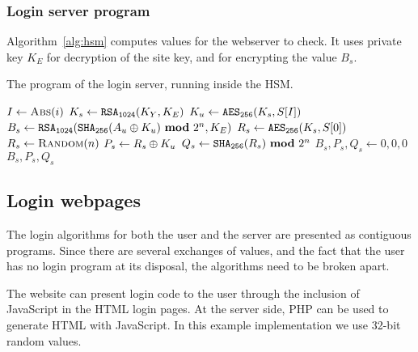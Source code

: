 \subsubsection{Login server program}
Algorithm~\vref{alg:hsm} computes values for the webserver to check.
It uses private key $K_E$ for decryption of the site key,
and for encrypting the value $B_s$.
\nopagebreak
\begin{algorithm}[H]
\caption{The program of the login server, running inside the HSM.}
\label{alg:hsm}
\begin{algorithmic}[1]
\State $I\gets\Call{Abs}{i}$ 
\State $K_s\gets\texttt{\ensuremath{\mathtt{RSA_{1024}}}}(K_Y,K_E)$	
\State $K_u\gets\texttt{\ensuremath{\mathtt{AES_{256}}}}(K_s,S[I])$	
\State $B_s\gets\texttt{\ensuremath{\mathtt{RSA_{1024}}}}(\texttt{\ensuremath{\mathtt{SHA_{256}}}}(A_u\oplus K_u)\ \textbf{mod}\ 2^{n},K_E)$ 
\State $R_s\gets\texttt{\ensuremath{\mathtt{AES_{256}}}}(K_s,S[0])$
\Else{}
\State $R_s\gets\Call{Random}{n}$
\EndIf
\State $P_s\gets R_s\oplus K_u$
\State $Q_s\gets\texttt{\ensuremath{\mathtt{SHA_{256}}}}(R_s)\ \textbf{mod}\ 2^{n}$
\Else{}
\State $B_s,P_s,Q_s\gets0,0,0$
\EndIf
\State \Return $B_s, P_s, Q_s$
\EndProcedure
\end{algorithmic}
\end{algorithm}
\subsection{Login webpages}
The login algorithms for both the user and the server are presented as contiguous programs.
Since there are several exchanges of values,
and the fact that the user has no login program at its disposal,
the algorithms need to be broken apart.
\par
The website can present login code to the user through the inclusion of JavaScript in the HTML login pages.
At the server side, PHP can be used to generate HTML with JavaScript.
In this example implementation we use 32-bit random values.
